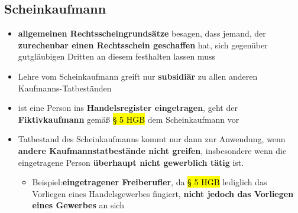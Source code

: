\documentclass[a4paper, 10pt]{article}
\begin{document}
\subsection{Scheinkaufmann}
\begin{itemize}
    \item \textbf{allgemeinen Rechtsscheingrundsätze} besagen, dass jemand, der \textbf{zurechenbar einen Rechtsschein geschaffen} hat, sich gegenüber gutgläubigen Dritten an diesem festhalten lassen muss
    \item Lehre vom Scheinkaufmann greift nur \textbf{subsidiär} zu allen anderen
Kaufmanns-Tatbeständen
\item ist eine Person ins \textbf{Handelsregister eingetragen}, geht der
\textbf{Fiktivkaufmann} gemäß \hl{§ 5 HGB} dem Scheinkaufmann vor
\item Tatbestand des Scheinkaufmanns kommt nur dann zur Anwendung, wenn \textbf{andere Kaufmannstatbestände nicht greifen}, insbesondere wenn die eingetragene Person \textbf{überhaupt nicht gewerblich tätig} ist.
\begin{itemize}
    \item Beispiel:\textbf{eingetragener Freiberufler}, da \hl{§ 5 HGB} lediglich das Vorliegen eines Handelsgewerbes fingiert,\textbf{ nicht jedoch das Vorliegen eines Gewerbes} an sich
\end{itemize}
\end{itemize}
\end{document}
